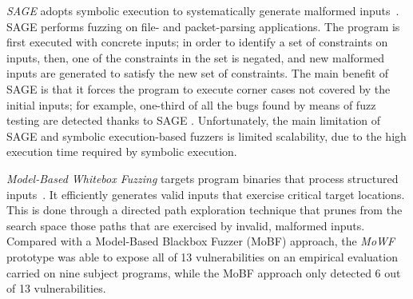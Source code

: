 \emph{SAGE} adopts symbolic execution to systematically generate malformed inputs~\cite{godefroid2012sage}. SAGE performs fuzzing on file- and packet-parsing applications. 
The program is first executed with concrete inputs; in order to identify a set of constraints on inputs, then, one of the constraints in the set is negated, and new malformed inputs are generated to satisfy the new set of constraints. 
The main benefit of SAGE is that it forces the program to execute corner cases not covered by the initial inputs; for example, 
one-third of all the bugs found by means of fuzz testing are detected thanks to SAGE \cite{bounimova2013billions}.
Unfortunately, the main limitation of SAGE and symbolic execution-based fuzzers is limited scalability, due to the high execution time required by symbolic execution.


\emph{Model-Based Whitebox Fuzzing} targets program binaries that process structured inputs~\cite{pham2016model}. It efficiently generates valid inputs that exercise critical target locations. This is done through a directed path exploration technique that prunes from the search space those paths that are exercised by invalid, malformed inputs.
Compared with a Model-Based Blackbox Fuzzer (MoBF) approach, the \emph{MoWF} prototype was able to expose all of 13 vulnerabilities on an empirical evaluation carried on nine subject programs, while the MoBF approach only detected 6 out of 13 vulnerabilities. 



